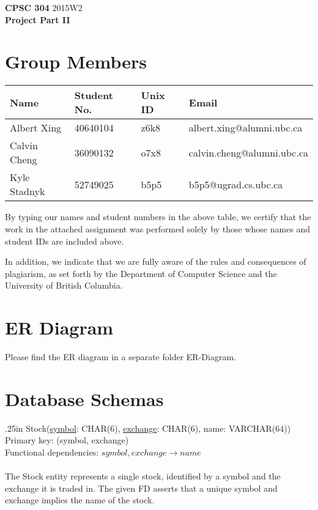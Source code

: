 \documentclass[letterpaper]{report}
\begin{document}
{\large \textbf{CPSC 304} 2015W2 \\ \textbf{Project Part II}}

\section*{Group Members}
\begin{tabular}{l l l l}
	\textbf{Name} & \textbf{Student No.} & \textbf{Unix ID} & \textbf{Email} \\ \hline
	Albert Xing & 40640104 & z6k8 & albert.xing@alumni.ubc.ca \\
	Calvin Cheng & 36090132 & o7x8 & calvin.cheng@alumni.ubc.ca \\
	Kyle Stadnyk & 52749025 & b5p5 & b5p5@ugrad.cs.ubc.ca
\end{tabular}

By typing our names and student numbers in the above table, we certify that the work in the attached assignment was performed solely by those whose names and student IDs are included above.

In addition, we indicate that we are fully aware of the rules and consequences of plagiarism, as set forth by the Department of Computer Science and the University of British Columbia.

\section*{ER Diagram}
Please find the ER diagram in a separate folder {\sffamily ER-Diagram}.

\section*{Database Schemas}

\hangindent .25in
{\sffamily Stock(\underline{symbol}: CHAR(6), \underline{exchange}: CHAR(6), name: VARCHAR(64))} \\
Primary key: {\sffamily (symbol, exchange)} \\
Functional dependencies: $symbol, exchange \to name$ \\\\
The {\sffamily Stock} entity represents a single stock, identified by a symbol and the exchange it is traded in. The given FD asserts that a unique symbol and exchange implies the name of the stock.
\end{document}
